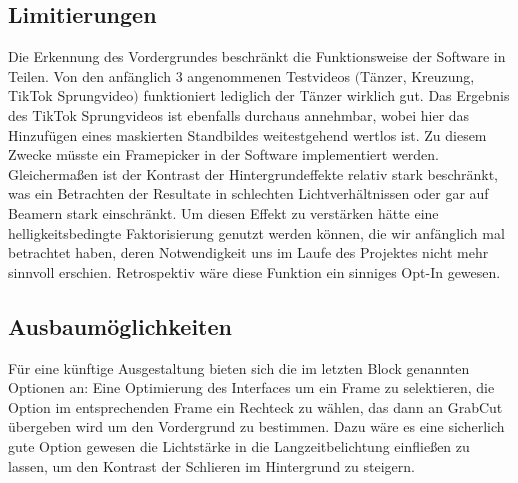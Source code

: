 \documentclass[12pt]{scrartcl}
\begin{document}
\subsection{Limitierungen}
Die Erkennung des Vordergrundes beschr\"ankt die Funktionsweise der Software in Teilen. Von den anf\"anglich 3 angenommenen Testvideos 
$ ( $T\"anzer, Kreuzung, TikTok Sprungvideo$ ) $ funktioniert lediglich der T\"anzer wirklich gut. Das Ergebnis des TikTok Sprungvideos ist 
ebenfalls durchaus annehmbar, wobei hier das Hinzuf\"ugen eines maskierten Standbildes weitestgehend wertlos ist. Zu diesem Zwecke m\"usste ein Framepicker in der Software implementiert werden. Gleicherma{\ss}en ist der Kontrast der Hintergrundeffekte relativ stark beschr\"ankt, was ein Betrachten der Resultate in schlechten Lichtverh\"altnissen oder gar auf Beamern stark einschr\"ankt. Um diesen Effekt zu verst\"arken h\"atte eine helligkeitsbedingte Faktorisierung genutzt werden k\"onnen, die wir anf\"anglich mal betrachtet haben, deren Notwendigkeit uns im Laufe des Projektes nicht mehr sinnvoll erschien. Retrospektiv w\"are diese Funktion ein sinniges Opt-In gewesen.
\subsection{Ausbaum\"oglichkeiten}
F\"ur eine k\"unftige Ausgestaltung bieten sich die im letzten Block genannten Optionen an: Eine Optimierung des Interfaces um ein Frame zu selektieren, die Option im entsprechenden Frame ein Rechteck zu w\"ahlen, das dann an GrabCut \"ubergeben wird um den Vordergrund zu bestimmen. Dazu w\"are es eine sicherlich gute Option gewesen die Lichtst\"arke in die Langzeitbelichtung einflie{\ss}en zu lassen, um den Kontrast der Schlieren im Hintergrund zu steigern.
\end{document}
